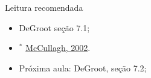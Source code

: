 \begin{frame}{Leitura recomendada}
\begin{itemize}
 \item[\faBook] DeGroot seção 7.1;
 \item[\faFilePdfO] $^\ast$ \href{https://projecteuclid.org/download/pdf_1/euclid.aos/1035844977}{McCullagh, 2002}.
 \item[\faForward] Próxima aula: DeGroot, seção 7.2;
\end{itemize} 
\end{frame}
